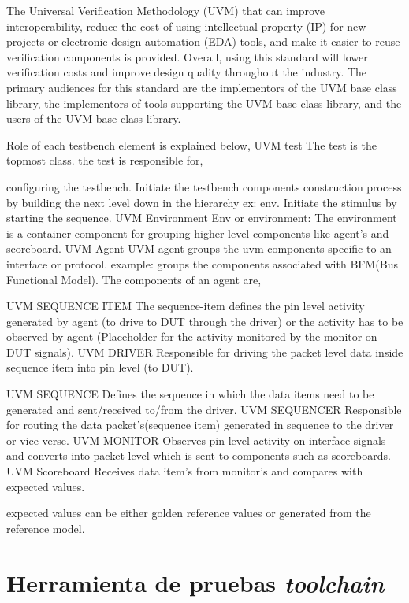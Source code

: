 \documentclass[a4paper]{article}
\begin{document}
The Universal Verification Methodology (UVM) that can improve interoperability, reduce the cost of using intellectual property (IP) for new projects or electronic design automation (EDA) tools, and make it easier to reuse verification components is provided. Overall, using this standard will lower verification costs and improve design quality throughout the industry. The primary audiences for this standard are the implementors of the UVM base class library, the implementors of tools supporting the UVM base class library, and the users of the UVM base class library.

Role of each testbench element is explained below,
UVM test
The test is the topmost class. the test is responsible for,

configuring the testbench.
Initiate the testbench components construction process by building the next level down in the hierarchy ex: env.
Initiate the stimulus by starting the sequence.
UVM Environment
Env or environment: The environment is a container component for grouping higher level components like agent’s and scoreboard.
UVM Agent
UVM agent groups the uvm components specific to an interface or protocol.
example: groups the components associated with BFM(Bus Functional Model).
The components of an agent are,

UVM SEQUENCE ITEM
The sequence-item defines the pin level activity generated by agent (to drive to DUT through the driver) or the activity has to be observed by agent (Placeholder for the activity monitored by the monitor on DUT signals).
UVM DRIVER
Responsible for driving the packet level data inside sequence item into pin level (to DUT).

UVM SEQUENCE
Defines the sequence in which the data items need to be generated and sent/received to/from the driver.
UVM SEQUENCER
Responsible for routing the data packet’s(sequence item) generated in sequence to the driver or vice verse.
UVM MONITOR
Observes pin level activity on interface signals and converts into packet level which is sent to components such as scoreboards.
UVM Scoreboard
Receives data item’s from monitor’s and compares with expected values.

expected values can be either golden reference values or generated from the reference model.

\section{Herramienta de pruebas \textit{toolchain}}
\end{document}
